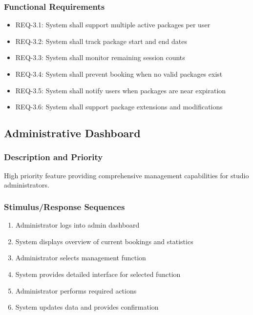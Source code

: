 \documentclass[12pt,a4paper]{article}
\begin{document}
\subsubsection{Functional Requirements}
\begin{itemize}
    \item REQ-3.1: System shall support multiple active packages per user
    \item REQ-3.2: System shall track package start and end dates
    \item REQ-3.3: System shall monitor remaining session counts
    \item REQ-3.4: System shall prevent booking when no valid packages exist
    \item REQ-3.5: System shall notify users when packages are near expiration
    \item REQ-3.6: System shall support package extensions and modifications
\end{itemize}

\subsection{Administrative Dashboard}
\subsubsection{Description and Priority}
High priority feature providing comprehensive management capabilities for studio administrators.

\subsubsection{Stimulus/Response Sequences}
\begin{enumerate}
    \item Administrator logs into admin dashboard
    \item System displays overview of current bookings and statistics
    \item Administrator selects management function
    \item System provides detailed interface for selected function
    \item Administrator performs required actions
    \item System updates data and provides confirmation
\end{enumerate}
\end{document}

